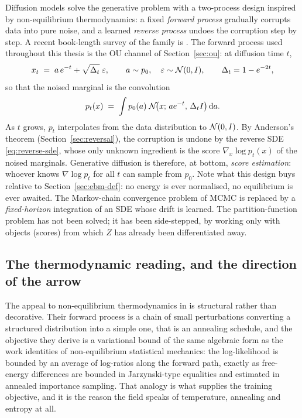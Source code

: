 Diffusion models \citep{sohl2015deep, ho2020denoising,
song2021scorebased} solve the generative problem with a two-process
design inspired by non-equilibrium thermodynamics: a fixed \emph{forward
process} gradually corrupts data into pure noise, and a learned
\emph{reverse process} undoes the corruption step by step. A recent
book-length survey of the family is \citet{lai2025principles}. The
forward process used throughout this thesis is the OU channel of
Section~\ref{sec:ou}: at diffusion time $t$,
\begin{equation}
  x_t \;=\; a\, e^{-t} + \sqrt{\Delta_t}\;\varepsilon,
  \qquad a \sim p_0,\quad \varepsilon \sim \mathcal{N}(0, I),
  \qquad \Delta_t = 1 - e^{-2t},
  \label{eq:forward-marginal}
\end{equation}
so that the noised marginal is the convolution
\begin{equation}
  p_t(x) \;=\; \int p_0(a)\; \mathcal{N}\!\big(x;\, a e^{-t},\, \Delta_t I\big)\,
  \mathrm{d} a .
  \label{eq:pt-convolution}
\end{equation}
As $t$ grows, $p_t$ interpolates from the data distribution to
$\mathcal{N}(0, I)$. By Anderson's theorem (Section~\ref{sec:reversal}), the
corruption is undone by the reverse SDE \eqref{eq:reverse-sde}, whose
only unknown ingredient is the score $\nabla_x \log p_t(x)$ of the noised
marginals. Generative diffusion is therefore, at bottom, \emph{score
estimation}: whoever knows $\nabla \log p_t$ for all $t$ can sample from
$p_0$. Note what this design buys relative to
Section~\ref{sec:ebm-def}: no energy is ever normalised, no equilibrium
is ever awaited. The Markov-chain convergence problem of MCMC is replaced
by a \emph{fixed-horizon} integration of an SDE whose drift is learned.
The partition-function problem has not been solved; it has been
side-stepped, by working only with objects (scores) from which $Z$ has
already been differentiated away.

\subsection{The thermodynamic reading, and the direction of the arrow}
\label{sec:diffusion-thermo}

The appeal to non-equilibrium thermodynamics in \citet{sohl2015deep} is
structural rather than decorative. Their forward process is a chain of small
perturbations converting a structured distribution into a simple one, that is
an annealing schedule, and the objective they derive is a variational bound of
the same algebraic form as the work identities of non-equilibrium statistical
mechanics: the log-likelihood is bounded by an average of log-ratios along the
forward path, exactly as free-energy differences are bounded in Jarzynski-type
equalities and estimated in annealed importance sampling. That analogy is what
supplies the training objective, and it is the reason the field speaks of
temperature, annealing and entropy at all.

